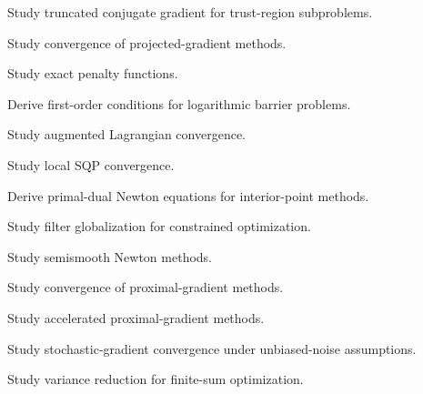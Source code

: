 \begin{exercise}[4]
Study truncated conjugate gradient for trust-region subproblems.
\end{exercise}

\begin{exercise}[4]
Study convergence of projected-gradient methods.
\end{exercise}

\begin{exercise}[4]
Study exact penalty functions.
\end{exercise}

\begin{exercise}[4]
Derive first-order conditions for logarithmic barrier problems.
\end{exercise}

\begin{exercise}[4]
Study augmented Lagrangian convergence.
\end{exercise}

\begin{exercise}[4]
Study local SQP convergence.
\end{exercise}

\begin{exercise}[4]
Derive primal-dual Newton equations for interior-point methods.
\end{exercise}

\begin{exercise}[4]
Study filter globalization for constrained optimization.
\end{exercise}

\begin{exercise}[4]
Study semismooth Newton methods.
\end{exercise}

\begin{exercise}[4]
Study convergence of proximal-gradient methods.
\end{exercise}

\begin{exercise}[4]
Study accelerated proximal-gradient methods.
\end{exercise}

\begin{exercise}[4]
Study stochastic-gradient convergence under unbiased-noise assumptions.
\end{exercise}

\begin{exercise}[4]
Study variance reduction for finite-sum optimization.
\end{exercise}

